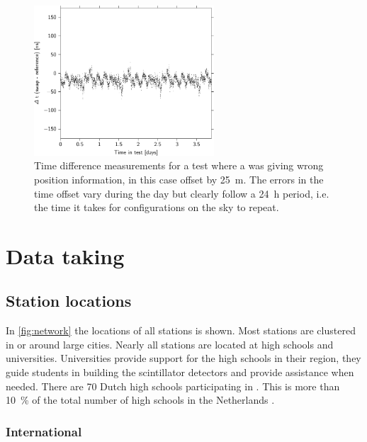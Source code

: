 \begin{figure}
    \centering
    \includegraphics[width=0.6\textwidth]
                    {plots/cluster/tt_delta_time_022}
    \caption{Time difference measurements for a test where a \gps was giving wrong position information, in this case offset by \SI{25}{\meter}. The errors in the time offset vary during the day but clearly follow a \SI{24}{\hour} period, i.e. the time it takes for \gps configurations on the sky to repeat.}
    \label{fig:tt_delta_time_022}
\end{figure}


\section{Data taking}


\subsection{Station locations}

In \cref{fig:network} the locations of all \hisparc stations is shown. Most stations are clustered in or around large cities. Nearly all stations are located at high schools and universities. Universities provide support for the high schools in their region, they guide students in building the scintillator detectors and provide assistance when needed. There are \num{70} Dutch high schools participating in \hisparc. This is more than \SI{10}{\percent} of the total number of high schools in the Netherlands \cite{duo2016hoofd}.


\subsubsection{International}

